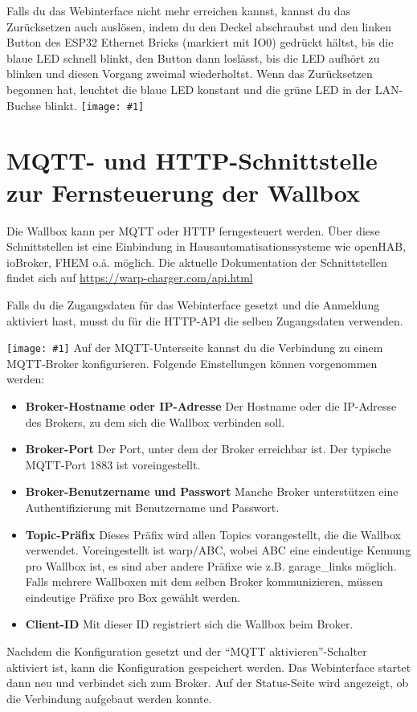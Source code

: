 \documentclass[a4paper,10pt]{article}
\newcommand{\gfx}[1]{\texttt{[image: \#1]}}
\begin{document}
\begin{multicols*}{2}
	Falls du das Webinterface nicht mehr erreichen kannst, kannst du das Zurücksetzen auch
	auslösen, indem du den Deckel abschraubst und den linken Button des ESP32 Ethernet Bricks (markiert mit IO0)
	gedrückt hältst, bis die blaue LED schnell blinkt, den Button dann loslässt, bis die LED aufhört zu blinken und
	diesen Vorgang zweimal wiederholtst. Wenn das Zurücksetzen begonnen hat, leuchtet die blaue LED konstant und
	die grüne LED in der LAN-Buchse blinkt.
	\gfx{./img_warp2/resized/warp_esp_open_small}
	\newpage
	\section{MQTT- und HTTP-Schnittstelle zur Fernsteuerung der Wallbox}
	Die Wallbox kann per MQTT oder HTTP ferngesteuert werden. Über diese Schnittstellen ist eine
	Einbindung in Hausautomatisationssysteme wie openHAB, ioBroker, FHEM o.ä. möglich. Die aktuelle
	Dokumentation der Schnittstellen findet sich auf \url{https://warp-charger.com/api.html}

	Falls du die Zugangsdaten für das Webinterface gesetzt und die Anmeldung aktiviert hast, musst du
	für die HTTP-API die selben Zugangsdaten verwenden.

	\gfx{./img_warp2/resized/web_mqtt}
	Auf der MQTT-Unterseite kannst du die Verbindung zu einem MQTT-Broker konfigurieren. Folgende Einstellungen können vorgenommen werden:
	\begin{itemize}
		\item \textbf{Broker-Hostname oder IP-Adresse} Der Hostname oder die IP-Adresse des Brokers, zu dem sich die Wallbox verbinden soll.
		\item \textbf{Broker-Port} Der Port, unter dem der Broker erreichbar ist. Der typische MQTT-Port 1883 ist voreingestellt.
		\item \textbf{Broker-Benutzername und Passwort} Manche Broker unterstützen eine Authentifizierung mit Benutzername und Passwort.
		\item \textbf{Topic-Präfix} Dieses Präfix wird allen Topics vorangestellt, die die Wallbox verwendet.
		      Voreingestellt ist warp/ABC, wobei ABC eine eindeutige Kennung pro Wallbox ist,
		      es sind aber andere Präfixe wie z.B. garage\_links möglich.
		      Falls mehrere Wallboxen mit dem selben Broker kommunizieren,
		      müssen eindeutige Präfixe pro Box gewählt werden.
		\item \textbf{Client-ID} Mit dieser ID registriert sich die Wallbox beim Broker.
	\end{itemize} 
	Nachdem die Konfiguration gesetzt und der \enquote{MQTT aktivieren}-Schalter aktiviert ist, kann die Konfiguration gespeichert werden.
	Das Webinterface startet dann neu und verbindet sich zum Broker.
	Auf der Status-Seite wird angezeigt, ob die Verbindung aufgebaut werden konnte.
	

\end{multicols*}
\end{document}
